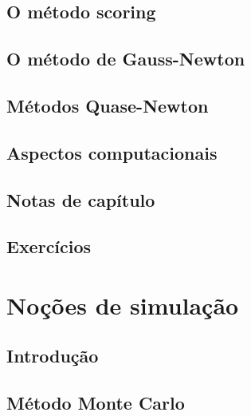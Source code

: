 \documentclass[
]{latex/krantz}
\theoremstyle{definition}
\theoremstyle{definition}
\theoremstyle{definition}
\theoremstyle{definition}
\theoremstyle{remark}
\begin{document}
\hypertarget{o-muxe9todo-scoring}{%
\section{O método scoring}\label{o-muxe9todo-scoring}}

\hypertarget{o-muxe9todo-de-gauss-newton}{%
\section{O método de Gauss-Newton}\label{o-muxe9todo-de-gauss-newton}}

\hypertarget{muxe9todos-quase-newton}{%
\section{Métodos Quase-Newton}\label{muxe9todos-quase-newton}}

\hypertarget{aspectos-computacionais}{%
\section{Aspectos computacionais}\label{aspectos-computacionais}}

\hypertarget{notas-de-capuxedtulo-13}{%
\section{Notas de capítulo}\label{notas-de-capuxedtulo-13}}

\hypertarget{exercuxedcios-13}{%
\section{Exercícios}\label{exercuxedcios-13}}

\hypertarget{nouxe7uxf5es-de-simulauxe7uxe3o}{%
\chapter{Noções de simulação}\label{nouxe7uxf5es-de-simulauxe7uxe3o}}

\hypertarget{introduuxe7uxe3o-14}{%
\section{Introdução}\label{introduuxe7uxe3o-14}}

\hypertarget{muxe9todo-monte-carlo}{%
\section{Método Monte Carlo}\label{muxe9todo-monte-carlo}}
\end{document}
